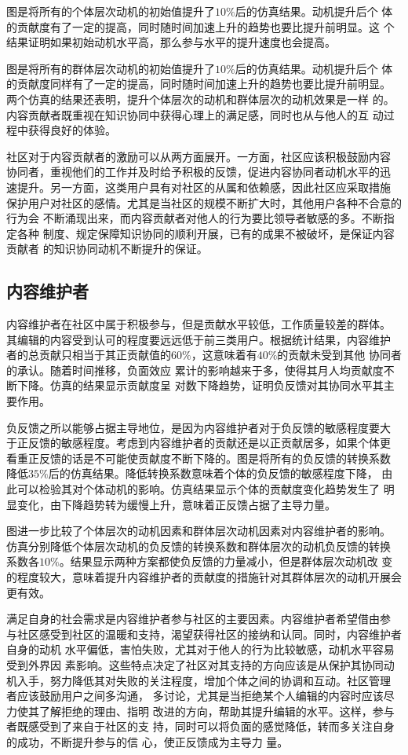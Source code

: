 图是将所有的个体层次动机的初始值提升了$10\%$后的仿真结果。动机提升后个
体的贡献度有了一定的提高，同时随时间加速上升的趋势也要比提升前明显。这
个结果证明如果初始动机水平高，那么参与水平的提升速度也会提高。

图是将所有的群体层次动机的初始值提升了$10\%$后的仿真结果。动机提升后个
体的贡献度同样有了一定的提高，同时随时间加速上升的趋势也要比提升前明显。
两个仿真的结果还表明，提升个体层次的动机和群体层次的动机效果是一样
的。内容贡献者既重视在知识协同中获得心理上的满足感，同时也从与他人的互
动过程中获得良好的体验。

社区对于内容贡献者的激励可以从两方面展开。一方面，社区应该积极鼓励内容
协同者，重视他们的工作并及时给予积极的反馈，促进内容协同者动机水平的迅
速提升。另一方面，这类用户具有对社区的从属和依赖感，因此社区应采取措施
保护用户对社区的感情。尤其是当社区的规模不断扩大时，其他用户各种不合意的行为会
不断涌现出来，而内容贡献者对他人的行为要比领导者敏感的多。不断指定各种
制度、规定保障知识协同的顺利开展，已有的成果不被破坏，是保证内容贡献者
的知识协同动机不断提升的保证。

\subsection{内容维护者}
内容维护者在社区中属于积极参与，但是贡献水平较低，工作质量较差的群体。
其编辑的内容受到认可的程度要远远低于前三类用户。根据统计结果，内容维护
者的总贡献只相当于其正贡献值的$60\%$，这意味着有$40\%$的贡献未受到其他
协同者的承认。随着时间推移，负面效应
累计的影响越来于多，使得其月人均贡献度不断下降。仿真的结果显示贡献度呈
对数下降趋势，证明负反馈对其协同水平其主要作用。

负反馈之所以能够占据主导地位，是因为内容维护者对于负反馈的敏感程度要大
于正反馈的敏感程度。考虑到内容维护者的贡献还是以正贡献居多，如果个体更
看重正反馈的话是不可能使贡献度不断下降的。图是将所有的负反馈的转换系数
降低$35\%$后的仿真结果。降低转换系数意味着个体的负反馈的敏感程度下降，
由此可以检验其对个体动机的影响。仿真结果显示个体的贡献度变化趋势发生了
明显变化，由下降趋势转为缓慢上升，意味着正反馈占据了主导力量。

图进一步比较了个体层次的动机因素和群体层次动机因素对内容维护者的影响。
仿真分别降低个体层次动机的负反馈的转换系数和群体层次的动机负反馈的转换
系数各$10\%$。结果显示两种方案都使负反馈的力量减小，但是群体层次动机改
变的程度较大，意味着提升内容维护者的贡献度的措施针对其群体层次的动机开展会更有效。

满足自身的社会需求是内容维护者参与社区的主要因素。内容维护者希望借由参
与社区感受到社区的温暖和支持，渴望获得社区的接纳和认同。同时，内容维护者自身的动机
水平偏低，害怕失败，尤其对于他人的行为比较敏感，动机水平容易受到外界因
素影响。这些特点决定了社区对其支持的方向应该是从保护其协同动
机入手，努力降低其对失败的关注程度，增加个体之间的协调和互动。社区管理
者应该鼓励用户之间多沟通，
多讨论，尤其是当拒绝某个人编辑的内容时应该尽力使其了解拒绝的理由、指明
改进的方向，帮助其提升编辑的水平。这样，参与者既感受到了来自于社区的支
持，同时可以将负面的感觉降低，转而多关注自身的成功，不断提升参与的信
心，使正反馈成为主导力
量。

